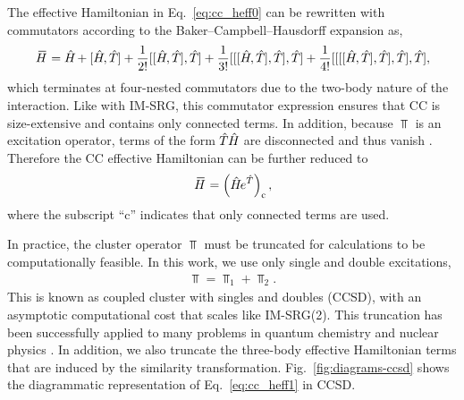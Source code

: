 \documentclass[thesis.tex]{subfiles}
\begin{document}
The effective Hamiltonian in Eq.\ \eqref{eq:cc_heff0} can be rewritten with commutators according to the Baker--Campbell--Hausdorff expansion as,
\begin{align*}
  \EHam = \Ham + [\Ham, \Top] + \frac{1}{2!} [[\Ham, \Top], \Top] + \frac{1}{3!} [[[\Ham, \Top], \Top], \Top] + \frac{1}{4!} [[[[\Ham, \Top], \Top], \Top], \Top],
\end{align*}
which terminates at four-nested commutators due to the two-body nature of the interaction.  Like with IM-SRG, this commutator expression ensures that CC is size-extensive and contains only connected terms.  In addition, because $\Top$ is an excitation operator, terms of the form $\hat{T}\hspace{-0.25pt}\hat{H}\hspace{-1pt}$ are disconnected and thus vanish \cite{SHAVITT2009}.  Therefore the CC effective Hamiltonian can be further reduced to
\begin{align} \label{eq:cc_heff1}
  \EHam = \left(\Ham e^{\hat{T}}\right)_{\mathrm{c}},
\end{align}
where the subscript ``$\mathrm{c}$'' indicates that only connected terms are used.

In practice, the cluster operator $\Top$ must be truncated for calculations to be computationally feasible.  In this work, we use only single and double excitations,
\begin{align*}
  \Top = \Top_{1} + \Top_{2}.
\end{align*}
This is known as coupled cluster with singles and doubles (CCSD), with an asymptotic computational cost that scales like IM-SRG(2).  This truncation has been successfully applied to many problems in quantum chemistry \cite{BARTLETT2007291} and nuclear physics \cite{HAGEN2014096302}.  In addition, we also truncate the three-body effective Hamiltonian terms that are induced by the similarity transformation.  Fig.\ \ref{fig:diagrams-ccsd} shows the diagrammatic representation of Eq.\ \eqref{eq:cc_heff1} in CCSD.
\end{document}
